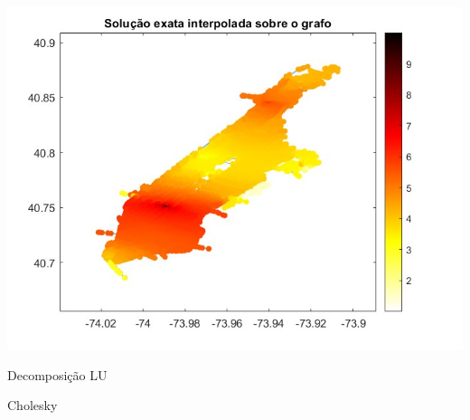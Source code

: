 \documentclass{beamer} %
\theoremstyle{definition}
\begin{document}
    \begin{frame}
        \centering
        \includegraphics[width=\textwidth]{exactsolution.jpeg}
    \end{frame}

    \begin{frame}{Decomposição LU}
        
    \end{frame}

    \begin{frame}{Cholesky}
        
    \end{frame}
\end{document}
